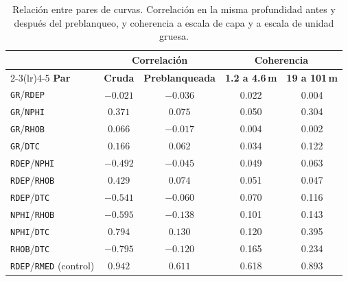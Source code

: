 \documentclass[11pt,a4paper]{article}
\begin{document}
\begin{table}[htbp]
\centering
\small
\caption{Relación entre pares de curvas. Correlación en la misma profundidad antes y después del preblanqueo, y coherencia a escala de capa y a escala de unidad gruesa.}
\label{tab:relacion-curvas}
\begin{tabular}{lcccc}
\toprule
 & \multicolumn{2}{c}{\textbf{Correlación}} & \multicolumn{2}{c}{\textbf{Coherencia}} \\
\cmidrule(lr){2-3}\cmidrule(lr){4-5}
\textbf{Par} & \textbf{Cruda} & \textbf{Preblanqueada} & \textbf{1.2 a 4.6\,m} & \textbf{19 a 101\,m} \\
\midrule
\texttt{GR}/\texttt{RDEP}   & $-0.021$ & $-0.036$ & 0.022 & 0.004 \\
\texttt{GR}/\texttt{NPHI}   & $0.371$  & $0.075$  & 0.050 & 0.304 \\
\texttt{GR}/\texttt{RHOB}   & $0.066$  & $-0.017$ & 0.004 & 0.002 \\
\texttt{GR}/\texttt{DTC}    & $0.166$  & $0.062$  & 0.034 & 0.122 \\
\texttt{RDEP}/\texttt{NPHI} & $-0.492$ & $-0.045$ & 0.049 & 0.063 \\
\texttt{RDEP}/\texttt{RHOB} & $0.429$  & $0.074$  & 0.051 & 0.047 \\
\texttt{RDEP}/\texttt{DTC}  & $-0.541$ & $-0.060$ & 0.070 & 0.116 \\
\texttt{NPHI}/\texttt{RHOB} & $-0.595$ & $-0.138$ & 0.101 & 0.143 \\
\texttt{NPHI}/\texttt{DTC}  & $0.794$  & $0.130$  & 0.120 & 0.395 \\
\texttt{RHOB}/\texttt{DTC}  & $-0.795$ & $-0.120$ & 0.165 & 0.234 \\
\midrule
\texttt{RDEP}/\texttt{RMED} (control) & $0.942$ & $0.611$ & 0.618 & 0.893 \\
\bottomrule
\end{tabular}
\end{table}
\end{document}

